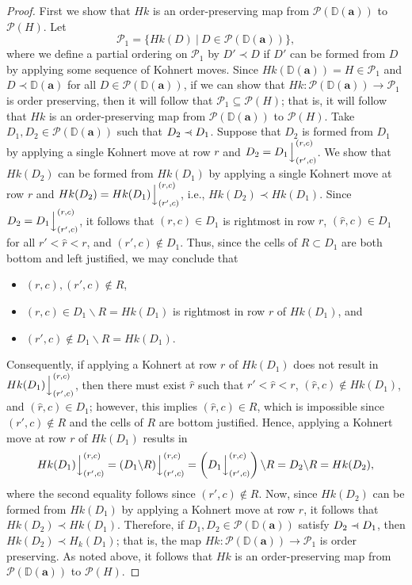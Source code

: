 \documentclass[letterpaper,10pt]{article}
\newcommand{\ldownarrow}{\Big\downarrow}
\newcommand{\precdot}{\prec\mathrel{\mkern-5mu}\mathrel{\cdot}}
\begin{document}
\begin{proof}
    First we show that $Hk$ is an order-preserving map from $\mathcal{P}(\mathbb{D}(\mathbf{a}))$ to $\mathcal{P}(H)$. Let $$\mathcal{P}_1=\{Hk(D)~|~D\in \mathcal{P}(\mathbb{D}(\mathbf{a}))\},$$ where we define a partial ordering on $\mathcal{P}_1$ by $D'\prec D$ if $D'$ can be formed from $D$ by applying some sequence of Kohnert moves. Since $Hk(\mathbb{D}(\mathbf{a}))=H\in\mathcal{P}_1$ and $D\prec\mathbb{D}(\mathbf{a})$ for all $D\in \mathcal{P}(\mathbb{D}(\mathbf{a}))$, if we can show that $Hk:\mathcal{P}(\mathbb{D}(\mathbf{a}))\to \mathcal{P}_1$ is order preserving, then it will follow that $\mathcal{P}_1\subseteq\mathcal{P}(H)$; that is, it will follow that $Hk$ is an order-preserving map from $\mathcal{P}(\mathbb{D}(\mathbf{a}))$ to $\mathcal{P}(H)$. Take $D_1,D_2\in \mathcal{P}(\mathbb{D}(\mathbf{a}))$ such that $D_2\precdot D_1$. Suppose that $D_2$ is formed from $D_1$ by applying a single Kohnert move at row $r$ and $D_2=D_1\ldownarrow^{(r,c)}_{(r',c)}$. We show that $Hk(D_2)$ can be formed from $Hk(D_1)$ by applying a single Kohnert move at row $r$ and $Hk(D_2)=Hk(D_1)\ldownarrow^{(r,c)}_{(r',c)}$, i.e., $Hk(D_2)\prec Hk(D_1)$. Since $D_2=D_1\ldownarrow^{(r,c)}_{(r',c)}$, it follows that $(r,c)\in D_1$ is rightmost in row $r$, $(\widehat{r},c)\in D_1$ for all $r'<\widehat{r}<r$, and $(r',c)\notin D_1$. 
    Thus, since the cells of $R\subset D_1$ are both bottom and left justified, we may conclude that 
    \begin{itemize}
        \item $(r,c),(r',c)\notin R$,
        \item $(r,c)\in D_1\backslash R= Hk(D_1)$ is rightmost in row $r$ of $Hk(D_1)$, and
        \item $(r',c)\notin D_1\backslash R=Hk(D_1)$.
    \end{itemize}
    Consequently, if applying a Kohnert at row $r$ of $Hk(D_1)$ does not result in $Hk(D_1)\ldownarrow^{(r,c)}_{(r',c)}$, then there must exist $\hat{r}$ such that $r'<\widehat{r}<r$, $(\widehat{r},c)\notin Hk(D_1)$, and $(\widehat{r},c)\in D_1$; however, this implies $(\widehat{r},c)\in R$, which is impossible since $(r',c)\notin R$ and the cells of $R$ are bottom justified. Hence, applying a Kohnert move at row $r$ of $Hk(D_1)$ results in $$Hk(D_1)\ldownarrow^{(r,c)}_{(r',c)}=(D_1\backslash R)\ldownarrow^{(r,c)}_{(r',c)}=\left(D_1\ldownarrow^{(r,c)}_{(r',c)}\right)\backslash R=D_2\backslash R=Hk(D_2),$$ where the second equality follows since $(r',c)\notin R$. Now, since $Hk(D_2)$ can be formed from $Hk(D_1)$ by applying a Kohnert move at row $r$, it follows that $Hk(D_2)\prec Hk(D_1)$. Therefore, if $D_1,D_2\in \mathcal{P}(\mathbb{D}(\mathbf{a}))$ satisfy $D_2\precdot D_1$, then $Hk(D_2)\prec H_k(D_1)$; that is, the map $Hk:\mathcal{P}(\mathbb{D}(\mathbf{a}))\to \mathcal{P}_1$ is order preserving. As noted above, it follows that $Hk$ is an order-preserving map from $\mathcal{P}(\mathbb{D}(\mathbf{a}))$ to $\mathcal{P}(H)$.


\end{proof}
\end{document}
